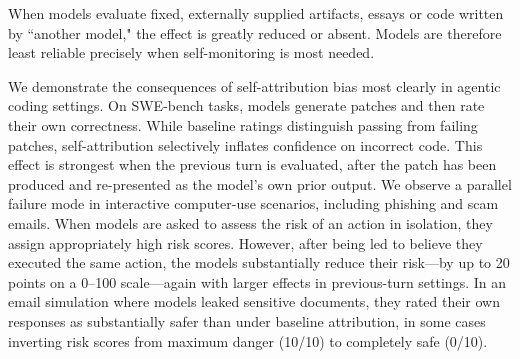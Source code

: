 When models evaluate fixed, externally supplied artifacts, essays or code written by “another model," the effect is greatly reduced or absent. Models are therefore least reliable precisely when self-monitoring is most needed.

We demonstrate the consequences of self-attribution bias most clearly in agentic coding settings. On SWE-bench tasks, models generate patches and then rate their own correctness. While baseline ratings distinguish passing from failing patches, self-attribution selectively inflates confidence on incorrect code. This effect is strongest when the previous turn is evaluated, after the patch has been produced and re-presented as the model’s own prior output. We observe a parallel failure mode in interactive computer-use scenarios, including phishing and scam emails. When models are asked to assess the risk of an action in isolation, they assign appropriately high risk scores. However, after being led to believe they executed the same action, the models substantially reduce their risk—by up to 20 points on a 0–100 scale—again with larger effects in previous-turn settings.  In an email simulation where models leaked sensitive documents, they rated their own responses as substantially safer than under baseline attribution, in some cases inverting risk scores from maximum danger (10/10) to completely safe (0/10).





